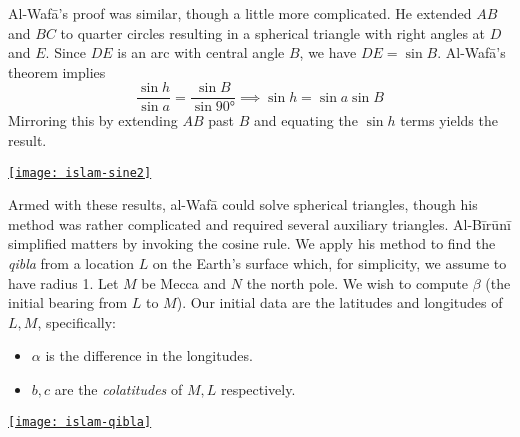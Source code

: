 \begin{minipage}[t]{0.65\linewidth}\vspace{0pt}
Al-Wafā's proof was similar, though a little more complicated. He extended $AB$ and $BC$ to quarter circles resulting in a spherical triangle with right angles at $D$ and $E$. Since $DE$ is an arc with central angle $B$, we have $DE=\sin B$. Al-Wafā's theorem implies
\[\frac{\sin h}{\sin a}=\frac{\sin B}{\sin \ang{90}}\implies \sin h=\sin a\sin B\]
Mirroring this by extending $AB$ past $B$ and equating the $\sin h$ terms yields the result.
\end{minipage}\hfill\begin{minipage}[t]{0.34\linewidth}\vspace{-15pt}
\flushright\href{http://math.uci.edu/~ndonalds/math184/islam-sine2.html}{\texttt{[image: islam-sine2]}}
\end{minipage}\smallbreak

\begin{minipage}[t]{0.65\linewidth}\vspace{0pt}
Armed with these results, al-Wafā could solve spherical triangles, though his method was rather complicated and required several auxiliary triangles. Al-Bīrūnī simplified matters by invoking the cosine rule. We apply his method to find the \emph{qibla} from a location $L$ on the Earth's surface which, for simplicity, we assume to have radius 1.\smallbreak
Let $M$ be Mecca and $N$ the north pole. We wish to compute $\beta$ (the initial bearing from $L$ to $M$). Our initial data are the latitudes and longitudes of $L,M$, specifically:
\begin{itemize}\itemsep0pt
  \item $\alpha$ is the difference in the longitudes.
  \item $b,c$ are the \emph{colatitudes}\footnotemark{} of $M,L$ respectively. 
\end{itemize} 
\end{minipage}\hfill\begin{minipage}[t]{0.34\linewidth}\vspace{0pt}
\flushright\href{http://math.uci.edu/~ndonalds/math184/islam-qibla.html}{\texttt{[image: islam-qibla]}}
\end{minipage}\medbreak


